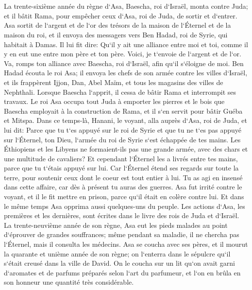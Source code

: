 \chapter{}

\verse La trente-sixième année du règne d`Asa, Baescha, roi d`Israël, monta contre Juda; et il bâtit Rama, pour empêcher ceux d`Asa, roi de Juda, de sortir et d`entrer. 
\verse Asa sortit de l`argent et de l`or des trésors de la maison de l`Éternel et de la maison du roi, et il envoya des messagers vers Ben Hadad, roi de Syrie, qui habitait à Damas. 
\verse Il lui fit dire: Qu`il y ait une alliance entre moi et toi, comme il y en eut une entre mon père et ton père. Voici, je t`envoie de l`argent et de l`or. Va, romps ton alliance avec Baescha, roi d`Israël, afin qu`il s`éloigne de moi. 
\verse Ben Hadad écouta le roi Asa; il envoya les chefs de son armée contre les villes d`Israël, et ils frappèrent Ijjon, Dan, Abel Maïm, et tous les magasins des villes de Nephthali. 
\verse Lorsque Baescha l`apprit, il cessa de bâtir Rama et interrompit ses travaux. 
\verse Le roi Asa occupa tout Juda à emporter les pierres et le bois que Baescha employait à la construction de Rama, et il s`en servit pour bâtir Guéba et Mitspa. 
\verse Dans ce temps-là, Hanani, le voyant, alla auprès d`Asa, roi de Juda, et lui dit: Parce que tu t`es appuyé sur le roi de Syrie et que tu ne t`es pas appuyé sur l`Éternel, ton Dieu, l`armée du roi de Syrie s`est échappée de tes mains. 
\verse Les Éthiopiens et les Libyens ne formaient-ils pas une grande armée, avec des chars et une multitude de cavaliers? Et cependant l`Éternel les a livrés entre tes mains, parce que tu t`étais appuyé sur lui. 
\verse Car l`Éternel étend ses regards sur toute la terre, pour soutenir ceux dont le coeur est tout entier à lui. Tu as agi en insensé dans cette affaire, car dès à présent tu auras des guerres. 
\verse Asa fut irrité contre le voyant, et il le fit mettre en prison, parce qu`il était en colère contre lui. Et dans le même temps Asa opprima aussi quelques-uns du peuple. 
\verse Les actions d`Asa, les premières et les dernières, sont écrites dans le livre des rois de Juda et d`Israël. 
\verse La trente-neuvième année de son règne, Asa eut les pieds malades au point d`éprouver de grandes souffrances; même pendant sa maladie, il ne chercha pas l`Éternel, mais il consulta les médecins. 
\verse Asa se coucha avec ses pères, et il mourut la quarante et unième année de son règne; 
\verse on l`enterra dans le sépulcre qu`il s`était creusé dans la ville de David. On le coucha sur un lit qu`on avait garni d`aromates et de parfums préparés selon l`art du parfumeur, et l`on en brûla en son honneur une quantité très considérable. 

